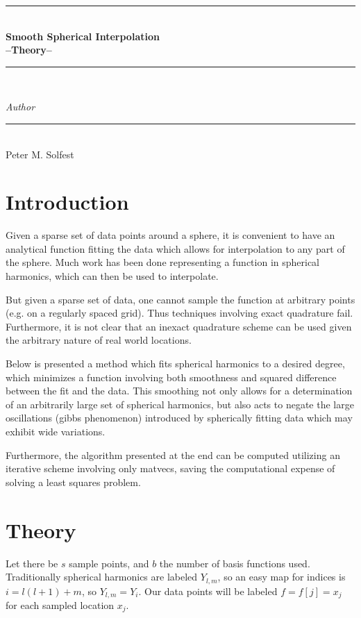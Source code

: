 \documentclass[12pt,a4paper]{article}
\begin{document}
\thispagestyle{empty}
\begin{center}
\rule{\textwidth}{.5mm} \\[0.8cm]
{\huge \bfseries Smooth Spherical Interpolation\\ --Theory--}\\[.4cm]
\rule{\textwidth}{.5mm} \\[1.5cm]

{\Large \textsl{Author}\\[-.6cm]\rule{60pt}{.2mm} \\[.4cm] Peter M. Solfest}
\newpage
\end{center}
\section{Introduction}
Given a sparse set of data points around a sphere,
it is convenient to have an analytical function fitting
the data which allows for interpolation to any part of the sphere.
Much work has been done representing a function in spherical harmonics,
which can then be used to interpolate.

But given a sparse set of data, one cannot sample the function at
arbitrary points (e.g. on a regularly spaced grid).
Thus techniques involving exact quadrature fail.
Furthermore, it is not clear that an inexact quadrature scheme can
be used given the arbitrary nature of real world locations.

Below is presented a method which fits spherical harmonics
to a desired degree, which minimizes a function involving both
smoothness and squared difference between the fit and the data.
This smoothing not only allows for a determination of an
arbitrarily large set of spherical harmonics, but also acts
to negate the large oscillations (gibbs phenomenon) introduced
by spherically fitting data which may exhibit wide variations.

Furthermore, the algorithm presented at the end can be computed
utilizing an iterative scheme involving only matvecs, saving
the computational expense of solving a least squares problem.

\section{Theory}
Let there be $s$ sample points, and $b$ the number of basis functions used.
Traditionally spherical harmonics are labeled $Y_{l,m}$, so an easy map for
indices is $i = l (l+1) + m$, so $Y_{l,m} = Y_i$.
Our data points will be labeled $f = f[j] = x_j$ for each sampled location $x_j$.
\end{document}
